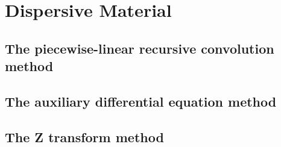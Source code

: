 \section{Dispersive Material}
\subsection{The piecewise-linear recursive convolution method}
\subsection{The auxiliary differential equation method}
\subsection{The Z transform method}
